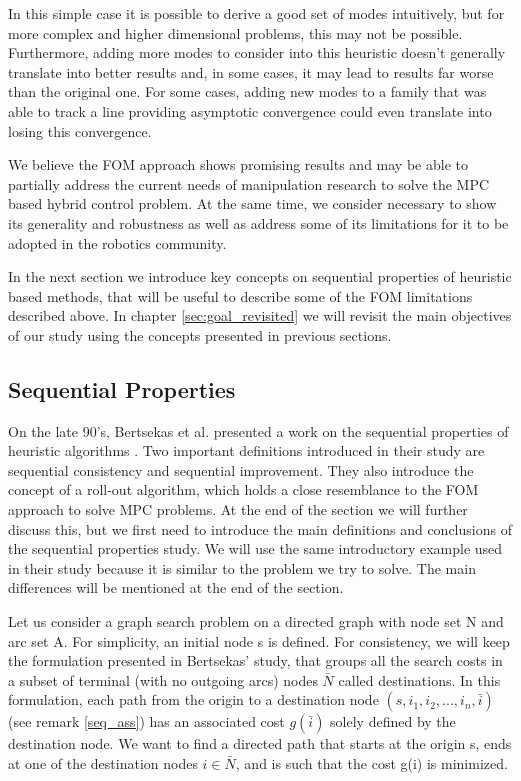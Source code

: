 \documentclass[12,twoside]{TFG-GM}
\theoremstyle{definition}
\theoremstyle{remark}
\newcommand*\mean[1]{\bar{#1}}
\newcommand*\diff[1]{\bar{#1}}
\begin{document}
In this simple case it is possible to derive a good set of modes intuitively, but for more complex and higher dimensional problems, this may not be possible. Furthermore, adding more modes to consider into this heuristic doesn't generally translate into better results and, in some cases, it may lead to results far worse than the original one. For some cases, adding new modes to a family that was able to track a line providing asymptotic convergence could even translate into losing this convergence.

We believe the FOM approach shows promising results and may be able to partially address the current needs of manipulation research to solve the MPC based hybrid control problem. At the same time, we consider necessary to show its generality and robustness as well as address some of its limitations for it to be adopted in the robotics community.

In the next section we introduce key concepts on sequential properties of heuristic based methods, that will be useful to describe some of the FOM limitations described above. In chapter \ref{sec:goal_revisited} we will revisit the main objectives of our study using the concepts presented in previous sections.

\subsection{Sequential Properties}
\label{subsec:sequential}
On the late 90's, Bertsekas et al. presented a work on the sequential properties of heuristic algorithms \cite{seq}. Two important definitions introduced in their study are sequential consistency and sequential improvement. They also introduce the concept of a roll-out algorithm, which holds a close resemblance to the FOM approach to solve MPC problems. At the end of the section we will further discuss this, but we first need to introduce the main definitions and conclusions of the sequential properties study. We will use the same introductory example used in their study because it is similar to the problem we try to solve. The main differences will be mentioned at the end of the section.

Let us consider a graph search problem on a directed graph with node set N and arc set A. For simplicity, an initial node s is defined. For consistency, we will keep the formulation presented in Bertsekas' study, that groups all the search costs in a subset of terminal (with no outgoing arcs) nodes $\mean{N}$ called destinations. In this formulation, each path from the origin to a destination node $(s, i_1, i_2,..., i_n, \diff{i})$ (see remark \ref{seq_ass}) has an associated cost $g(\diff{i})$ solely defined by the destination node.  We want to find a directed path that starts at the origin s, ends at one of the destination nodes $i \in \mean{N}$, and is such that the cost g(i) is minimized.
\end{document}
